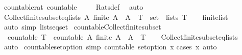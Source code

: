 \begin{isabellebody}
%
\isadelimproof
\isanewline
%
\endisadelimproof
\isanewline
{}\isamarkupfalse%
\ countable{\isacharunderscore}rat{\isacharcolon}\ {\isachardoublequoteopen}countable\ {\isasymrat}{\isachardoublequoteclose}\isanewline
%
\isadelimproof
\ \ %
\endisadelimproof
%
\isatagproof
{}\isamarkupfalse%
\ Rats{\isacharunderscore}def\ \isamarkupfalse%
\ auto%
\endisatagproof
{\isafoldproof}%
%
\isadelimproof
\isanewline
%
\endisadelimproof
\isanewline
{}\isamarkupfalse%
\ Collect{\isacharunderscore}finite{\isacharunderscore}subset{\isacharunderscore}eq{\isacharunderscore}lists{\isacharcolon}\ {\isachardoublequoteopen}{\isacharbraceleft}A{\isachardot}\ finite\ A\ {\isasymand}\ A\ {\isasymsubseteq}\ T{\isacharbraceright}\ {\isacharequal}\ set\ {\isacharbackquote}\ lists\ T{\isachardoublequoteclose}\isanewline
%
\isadelimproof
\ \ %
\endisadelimproof
%
\isatagproof
{}\isamarkupfalse%
\ finite{\isacharunderscore}list\ \isamarkupfalse%
\ {\isacharparenleft}auto\ simp{\isacharcolon}\ lists{\isacharunderscore}eq{\isacharunderscore}set{\isacharparenright}%
\endisatagproof
{\isafoldproof}%
%
\isadelimproof
\isanewline
%
\endisadelimproof
\isanewline
{}\isamarkupfalse%
\ countable{\isacharunderscore}Collect{\isacharunderscore}finite{\isacharunderscore}subset{\isacharcolon}\isanewline
\ \ {\isachardoublequoteopen}countable\ T\ {\isasymLongrightarrow}\ countable\ {\isacharbraceleft}A{\isachardot}\ finite\ A\ {\isasymand}\ A\ {\isasymsubseteq}\ T{\isacharbraceright}{\isachardoublequoteclose}\isanewline
%
\isadelimproof
\ \ %
\endisadelimproof
%
\isatagproof
{}\isamarkupfalse%
\ Collect{\isacharunderscore}finite{\isacharunderscore}subset{\isacharunderscore}eq{\isacharunderscore}lists\ \isamarkupfalse%
\ auto%
\endisatagproof
{\isafoldproof}%
%
\isadelimproof
\isanewline
%
\endisadelimproof
\isanewline
{}\isamarkupfalse%
\ countable{\isacharunderscore}set{\isacharunderscore}option\ {\isacharbrackleft}simp{\isacharbrackright}{\isacharcolon}\ {\isachardoublequoteopen}countable\ {\isacharparenleft}set{\isacharunderscore}option\ x{\isacharparenright}{\isachardoublequoteclose}\isanewline
%
\isadelimproof
%
\endisadelimproof
%
\isatagproof
{}\isamarkupfalse%
{\isacharparenleft}cases\ x{\isacharparenright}\ auto%
\endisatagproof
{\isafoldproof}%
%
\isadelimproof
%
\endisadelimproof
%
\isadelimdocument
%
\endisadelimdocument
%
\isatagdocument
%
\isamarkuptrue%
%
\endisatagdocument

\end{isabellebody}
